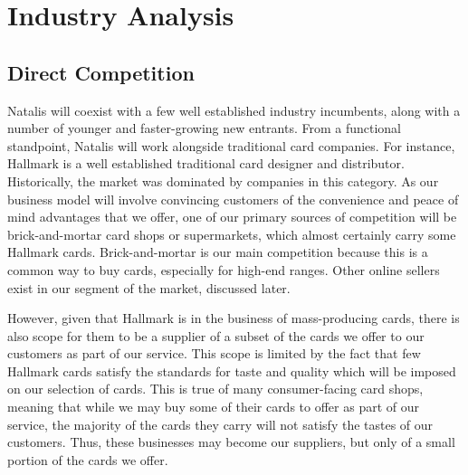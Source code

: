 \documentclass[10pt,a4paper]{article}
\begin{document}
\section*{Industry Analysis}
\subsection*{Direct Competition}



Natalis will coexist with a few well established industry incumbents, along with a number of younger and faster-growing new entrants. From a functional standpoint, Natalis will work alongside traditional card companies. For instance, Hallmark is a well established traditional card designer and distributor. Historically, the market was dominated by companies in this category. As our business model will involve convincing customers of the convenience and peace of mind advantages that we offer, one of our primary sources of competition will be brick-and-mortar card shops or supermarkets, which almost certainly carry some Hallmark cards. Brick-and-mortar is our main competition because this is a common way to buy cards, especially for high-end ranges. Other online sellers exist in our segment of the market, discussed later.

However, given that Hallmark is in the business of mass-producing cards, there is also scope for them to be a supplier of a subset of the cards we offer to our customers as part of our service. This scope is limited by the fact that few Hallmark cards satisfy the standards for taste and quality which will be imposed on our selection of cards. This is true of many consumer-facing card shops, meaning that while we may buy some of their cards to offer as part of our service, the majority of the cards they carry will not satisfy the tastes of our customers. Thus, these businesses may become our suppliers, but only of a small portion of the cards we offer.
\end{document}
